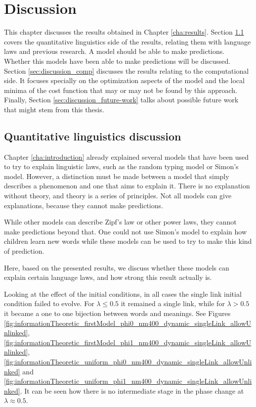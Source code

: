 \chapter{Discussion}
\label{cha:discussion}

This chapter discusses the results obtained in Chapter \ref{cha:results}.
Section \ref{sec:discussion_math} covers the quantitative linguistics side of the results, relating them with language laws and previous research.
A model should be able to make predictions.
Whether this models have been able to make predictions will be discussed.
Section \ref{sec:discussion_comp} discusses the results relating to the computational side.
It focuses specially on the optimization aspects of the model and the local minima of the cost function that may or may not be found by this approach.
Finally, Section \ref{sec:discussion_future-work} talks about possible future work that might stem from this thesis.

\section{Quantitative linguistics discussion}
\label{sec:discussion_math}

Chapter \ref{cha:introduction} already explained several models that have been used to try to explain linguistic laws, such as the random typing model or Simon's model.
However, a distinction must be made between a model that simply describes a phenomenon and one that aims to explain it.
There is no explanation without theory, and theory is a series of principles.
Not all models can give explanations, because they cannot make predictions.

While other models can describe Zipf's law or other power laws, they cannot make predictions beyond that.
One could not use Simon's model to explain how children learn new words while these models can be used to try to make this kind of prediction. \cite{Ferrer2017a} \cite{Carrera2021a}

Here, based on the presented results, we discuss whether these models can explain certain language laws, and how strong this result actually is.

Looking at the effect of the initial conditions, in all cases the single link initial condition failed to evolve.
For $\lambda \leq 0.5$ it remained a single link, while for $\lambda > 0.5$ it became a one to one bijection between words and meanings. See Figures \ref{fig:informationTheoretic_firstModel_phi0_nm400_dynamic_singleLink_allowUnlinked}, \ref{fig:informationTheoretic_firstModel_phi1_nm400_dynamic_singleLink_allowUnlinked}, \ref{fig:informationTheoretic_uniform_phi0_nm400_dynamic_singleLink_allowUnlinked} and \ref{fig:informationTheoretic_uniform_phi1_nm400_dynamic_singleLink_allowUnlinked}. It can be seen how there is no intermediate stage in the phase change at $\lambda \approx 0.5$.

